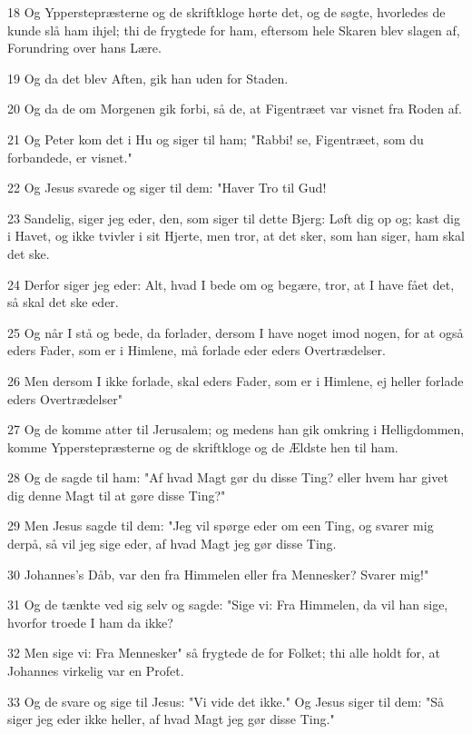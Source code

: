 \par 18 Og Ypperstepræsterne og de skriftkloge hørte det, og de søgte, hvorledes de kunde slå ham ihjel; thi de frygtede for ham, eftersom hele Skaren blev slagen af, Forundring over hans Lære.
\par 19 Og da det blev Aften, gik han uden for Staden.
\par 20 Og da de om Morgenen gik forbi, så de, at Figentræet var visnet fra Roden af.
\par 21 Og Peter kom det i Hu og siger til ham; "Rabbi! se, Figentræet, som du forbandede, er visnet."
\par 22 Og Jesus svarede og siger til dem: "Haver Tro til Gud!
\par 23 Sandelig, siger jeg eder, den, som siger til dette Bjerg: Løft dig op og; kast dig i Havet, og ikke tvivler i sit Hjerte, men tror, at det sker, som han siger, ham skal det ske.
\par 24 Derfor siger jeg eder: Alt, hvad I bede om og begære, tror, at I have fået det, så skal det ske eder.
\par 25 Og når I stå og bede, da forlader, dersom I have noget imod nogen, for at også eders Fader, som er i Himlene, må forlade eder eders Overtrædelser.
\par 26 Men dersom I ikke forlade, skal eders Fader, som er i Himlene, ej heller forlade eders Overtrædelser"
\par 27 Og de komme atter til Jerusalem; og medens han gik omkring i Helligdommen, komme Ypperstepræsterne og de skriftkloge og de Ældste hen til ham.
\par 28 Og de sagde til ham: "Af hvad Magt gør du disse Ting? eller hvem har givet dig denne Magt til at gøre disse Ting?"
\par 29 Men Jesus sagde til dem: "Jeg vil spørge eder om een Ting, og svarer mig derpå, så vil jeg sige eder, af hvad Magt jeg gør disse Ting.
\par 30 Johannes's Dåb, var den fra Himmelen eller fra Mennesker? Svarer mig!"
\par 31 Og de tænkte ved sig selv og sagde: "Sige vi: Fra Himmelen, da vil han sige, hvorfor troede I ham da ikke?
\par 32 Men sige vi: Fra Mennesker" så frygtede de for Folket; thi alle holdt for, at Johannes virkelig var en Profet.
\par 33 Og de svare og sige til Jesus: "Vi vide det ikke." Og Jesus siger til dem: "Så siger jeg eder ikke heller, af hvad Magt jeg gør disse Ting."

